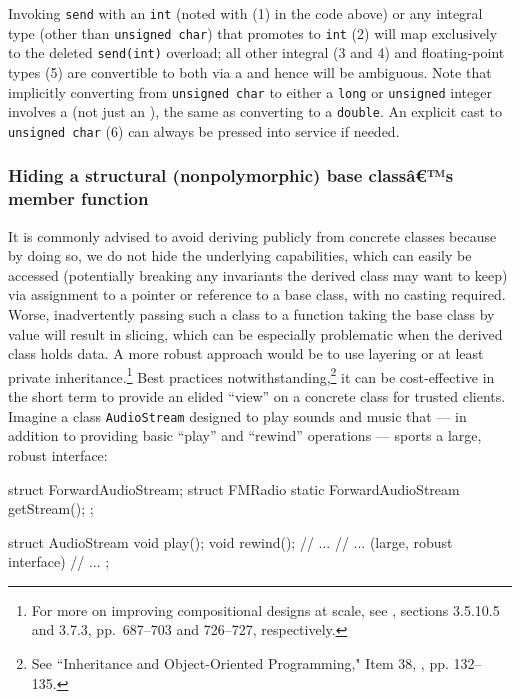 \noindent Invoking \lstinline!send! with an \lstinline!int! (noted with (1) in the code above) or any integral type
(other than \lstinline!unsigned!~\lstinline!char!) that promotes to \lstinline!int! (2)
will map exclusively to the deleted \lstinline!send(int)! overload; all
other integral (3 and 4) and floating-point types (5) are convertible to
both via a  and hence will be ambiguous. Note that
implicitly converting from \lstinline!unsigned!~\lstinline!char! to either a
\lstinline!long! or \lstinline!unsigned! integer involves a  (not just an ), the same as
  converting to a \lstinline!double!.
An explicit cast to \lstinline!unsigned!~\lstinline!char! (6) can always be
pressed into service if needed.

\subsubsection[Hiding a structural (nonpolymorphic) base class's member function]{Hiding a structural (nonpolymorphic) base classâ€™s member function}\label{hiding-a-structural-(nonpolymorphic)-base-class's-member-function}

It is commonly advised to avoid deriving publicly from concrete classes because by doing so, we do not hide the underlying capabilities, which can easily be accessed (potentially breaking any invariants the derived class may want to keep) via assignment to a pointer or reference to a base class, with no casting required.  Worse, inadvertently passing such a class to a function taking the base class by value will result in slicing, which can be especially problematic when the derived class holds data. A more robust approach would be to use layering or at least private inheritance.\footnote{For more on improving compositional designs at scale, see
  \cite{lakos20}, sections 3.5.10.5 and 3.7.3, pp.~687--703 and
  726--727, respectively.} Best practices notwithstanding,\footnote{See ``Inheritance and Object-Oriented Programming," Item 38, \cite{meyers92}, pp. 132--135.} it can be cost-effective in the short
term to provide an elided ``view'' on a concrete class for trusted
clients. Imagine a class \lstinline!AudioStream! designed to play sounds
and music that --- in addition to providing basic ``play'' and
``rewind'' operations --- sports a large, robust interface:

\begin{emcppshiddenlisting}[emcppsbatch=e2]
struct ForwardAudioStream;
struct FMRadio {
    static ForwardAudioStream getStream();
};
\end{emcppshiddenlisting}
\begin{emcppslisting}[emcppsbatch=e2]
struct AudioStream
{
    void play();
    void rewind();
    // ...
    // ... (large, robust interface)
    // ...
};
\end{emcppslisting}


